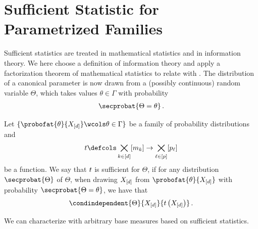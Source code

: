\documentclass[aps,onecolumn,nofootinbib,pra]{article}
\begin{document}
    \section{Sufficient Statistic for Parametrized Families}

    Sufficient statistics are treated in mathematical statistics and in information theory.
    We here choose a definition of information theory and apply a factorization theorem of mathematical statistics to relate with \ComputationActivationNetworks{}.
    The distribution of a canonical parameter is now drawn from a (possibly continuous) random variable $\Theta$, which takes values $\theta\in\Gamma$ with probability
    \begin{align*}
        \secprobat{\Theta=\theta} \, .
    \end{align*}

    \begin{definition}
        Let $\{\probofat{\theta}{\shortcatvariables}\wcols\theta\in\Gamma\}$ be a family of probability distributions and
        \begin{align*}
            \sstat\defcols\facstates\rightarrow\bigtimes_{\selindexin}[\seldimof{\selindex}]
        \end{align*}
        be a function.
        We say that $t$ is sufficient for $\Theta$, if for any distribution $\secprobat{\Theta}$ of $\Theta$, when drawing $X_{[d]}$ from $\probofat{\theta}{\shortcatvariables}$ with probability $\secprobat{\Theta=\theta}$, we have that
        \begin{align*}
            \condindependent{\Theta}{\shortcatvariables}{\sstatat{\shortcatvariables}} \, .
        \end{align*}
    \end{definition}

    We can characterize \ComputationActivationNetworks{} with arbitrary base measures based on sufficient statistics.
\end{document}
